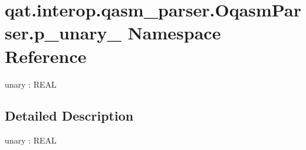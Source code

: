 \hypertarget{namespaceqat_1_1interop_1_1qasm__parser_1_1OqasmParser_1_1p__unary__1}{\section{qat.\-interop.\-qasm\-\_\-parser.\-Oqasm\-Parser.\-p\-\_\-unary\-\_ Namespace Reference}
\label{namespaceqat_1_1interop_1_1qasm__parser_1_1OqasmParser_1_1p__unary__1}
}


unary \-: R\-E\-A\-L  




\subsection{Detailed Description}
unary \-: R\-E\-A\-L 